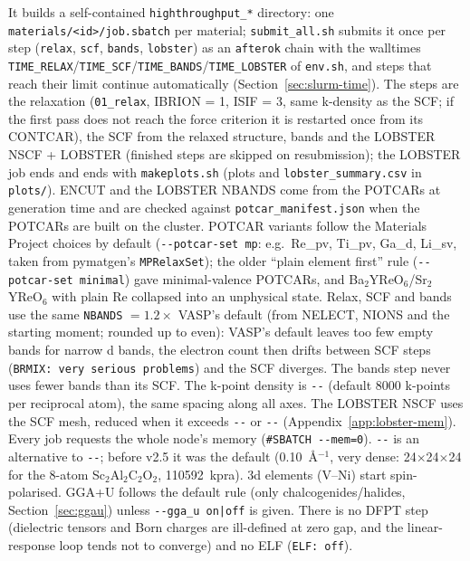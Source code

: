 \documentclass[11pt,a4paper]{scrartcl}
\newcommand{\opt}[1]{\texttt{-{}-\detokenize{#1}}}
\begin{document}
It builds a self-contained \texttt{highthroughput\_*} directory: one
\texttt{materials/<id>/job.sbatch} per material; \texttt{submit\_all.sh}
submits it once per step (\texttt{relax}, \texttt{scf}, \texttt{bands},
\texttt{lobster}) as an \texttt{afterok} chain with the walltimes
\texttt{TIME\_RELAX}/\texttt{TIME\_SCF}/\texttt{TIME\_BANDS}/\texttt{TIME\_LOBSTER}
of \texttt{env.sh}, and steps that reach their limit continue automatically
(Section~\ref{sec:slurm-time}).  The steps are the relaxation
(\texttt{01\_relax}, IBRION = 1, ISIF = 3, same k-density as the SCF; if the
first pass does not reach the force criterion it is restarted once from its
CONTCAR), the SCF from the relaxed structure, bands and the LOBSTER NSCF +
LOBSTER (finished steps are skipped on resubmission); the LOBSTER job ends and ends with \texttt{makeplots.sh} (plots and
\texttt{lobster\_summary.csv} in \texttt{plots/}).  ENCUT and the LOBSTER
NBANDS come from the POTCARs at generation time and are checked against
\texttt{potcar\_manifest.json} when the POTCARs are built on the cluster.
POTCAR variants follow the Materials Project choices by default
(\texttt{-{}-potcar-set mp}: e.g.\ Re\_pv, Ti\_pv, Ga\_d, Li\_sv, taken from
pymatgen's \texttt{MPRelaxSet}); the older ``plain element first'' rule
(\texttt{-{}-potcar-set minimal}) gave minimal-valence POTCARs, and
Ba$_2$YReO$_6$/Sr$_2$YReO$_6$ with plain Re collapsed into an unphysical state.
Relax, SCF and bands use the same \texttt{NBANDS} $= 1.2\times$ VASP's default
(from NELECT, NIONS and the starting moment; rounded up to even): VASP's default
leaves too few empty bands for narrow d bands, the electron count then drifts
between SCF steps (\texttt{BRMIX: very serious problems}) and the SCF diverges.
The bands step never uses fewer bands than its SCF.  The k-point density is
\opt{kpra} (default 8000 k-points per reciprocal atom), the same spacing along all
axes.  The LOBSTER NSCF uses the SCF mesh, reduced when it exceeds
\opt{lobster-max-kpts} or \opt{lobster-max-kpw} (Appendix~\ref{app:lobster-mem}).  Every
job requests the whole node's memory (\texttt{\#SBATCH -{}-mem=0}).  \opt{kspacing} is
an alternative to \opt{kpra}; before v2.5 it was the default (0.10~\AA$^{-1}$, very
dense: 24$\times$24$\times$24 for the 8-atom Sc$_2$Al$_2$C$_2$O$_2$, 110592~kpra).
3d elements (V--Ni) start spin-polarised.  GGA+U follows the default rule
(only chalcogenides/halides, Section~\ref{sec:ggau}) unless
\texttt{-{}-gga\_u on|off} is given.  There is no DFPT step (dielectric
tensors and Born charges are ill-defined at zero gap, and the linear-response
loop tends not to converge) and no ELF (\texttt{ELF: off}).
\end{document}
